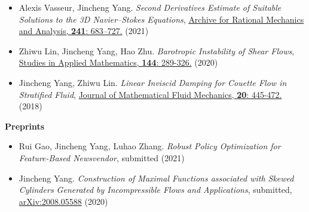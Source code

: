 \documentclass[margin,line]{res}
\begin{document}
\begin{resume}
\begin{itemize}[leftmargin=0.15in, label=$\sqbullet$]
    
    \item Alexis Vasseur, Jincheng Yang. \textit{Second Derivatives Estimate of Suitable Solutions to the 3D Navier--Stokes Equations},  \href{https://doi.org/10.1007/s00205-021-01661-4}{Archive for Rational Mechanics and Analysis, \textbf{241}: 683–727.} (2021)

    \item Zhiwu Lin, Jincheng Yang, Hao Zhu. \textit{Barotropic Instability of Shear Flows}, 
    \href{https://doi.org/10.1111/sapm.12297}{Studies in Applied Mathematics, \textbf{144}: 289-326.} (2020)
    
    \item Jincheng Yang, Zhiwu Lin. \textit{Linear Inviscid Damping for Couette Flow in Stratified Fluid}, \href{https://doi.org/10.1007/s00021-017-0328-3}{Journal of Mathematical Fluid Mechanics, \textbf{20}: 445-472.} (2018)
\end{itemize}

{\bf Preprints}
\vvspace

\begin{itemize}[leftmargin=0.15in, label=$\sqbullet$]

    \item Rui Gao, Jincheng Yang, Luhao Zhang. \textit{Robust Policy Optimization for Feature-Based Newsvendor}, submitted (2021) 

    \item Jincheng Yang. \textit{Construction of Maximal Functions associated with Skewed Cylinders Generated by Incompressible Flows and Applications}, submitted, \href{https://arxiv.org/abs/2008.05588}{arXiv:2008.05588} (2020)
    
\end{itemize}





\end{resume}
\end{document}
